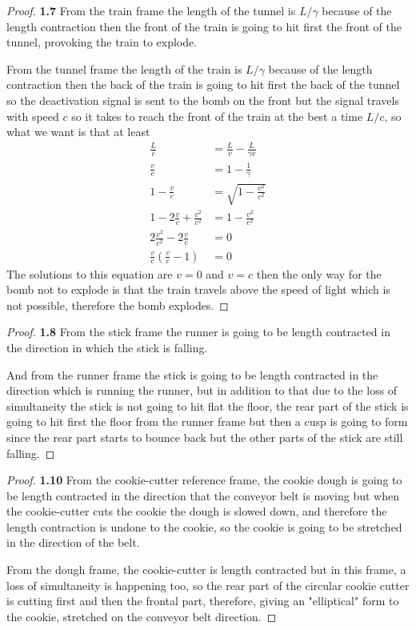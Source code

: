 \documentclass[11pt]{article}
\theoremstyle{definition}
\begin{document}
	\begin{proof}{\textbf{1.7}}
        From the train frame the length of the tunnel is $L/\gamma$ because of
        the length contraction then the front of the train is going to hit
        first the front of the tunnel, provoking the train to explode.
        
        From the tunnel frame the length of the train is $L/\gamma$ because of
        the length contraction then the back of the train is going to hit first
        the back of the tunnel so the deactivation signal is sent to the bomb
        on the front but the signal travels with speed $c$ so it takes to reach
        the front of the train at the best a time $L/c$, so what we want is that
        at least
        \begin{align*}
            \frac{L}{c} &= \frac{L}{v} - \frac{L}{\gamma v}\\
            \frac{v}{c} &= 1 - \frac{1}{\gamma}\\
            1 - \frac{v}{c} &= \sqrt{1 - \frac{v^2}{c^2}}\\
            1 - 2\frac{v}{c} + \frac{v^2}{c^2} &= 1 - \frac{v^2}{c^2}\\
            2\frac{v^2}{c^2} - 2\frac{v}{c} &= 0\\
            \frac{v}{c}(\frac{v}{c} - 1) &= 0
        \end{align*}
        The solutions to this equation are $v=0$ and $v=c$ then the only way
        for the bomb not to explode is that the train travels above the speed
        of light which is not possible, therefore the bomb explodes.
    \end{proof}
	\begin{proof}{\textbf{1.8}}
        From the stick frame the runner is going to be length contracted in the
        direction in which the stick is falling.
        
        And from the runner frame the stick is going to be length contracted in
        the direction which is running the runner, but in addition to that
        due to the loss of simultaneity the stick is not going to hit flat
        the floor, the rear part of the stick is going to hit first the floor
        from the runner frame but then a cusp is going to form since the rear
        part starts to bounce back but the other parts of the stick are still
        falling.
    \end{proof}
	\begin{proof}{\textbf{1.10}}
        From the cookie-cutter reference frame, the cookie dough is going to be
        length contracted in the direction that the conveyor belt is moving
        but when the cookie-cutter cuts the cookie the dough is slowed down, and
        therefore the length contraction is undone to the cookie, so the cookie
        is going to be stretched in the direction of the belt.
        
        From the dough frame, the cookie-cutter is length contracted but in
        this frame, a loss of simultaneity is happening too, so the rear part
        of the circular cookie cutter is cutting first and then the frontal
        part, therefore, giving an "elliptical" form to the cookie, stretched
        on the conveyor belt direction.  
    \end{proof}
\end{document}
